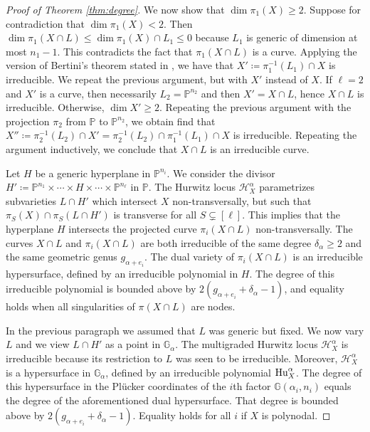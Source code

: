 \documentclass[12pt]{article}
\theoremstyle{definition}
\newcommand{\bG}{\mathbb G}
\newcommand{\bP}{\mathbb P}
\begin{document}
\begin{proof}[Proof of Theorem \ref{thm:degree}]
We now show that $\dim\pi_1(X)\ge 2$. Suppose for contradiction that $\dim\pi_1(X)<2$. Then $\dim\pi_1(X\cap L)\le\dim \pi_1(X)\cap L_1\le 0$ because $L_1$ is generic of dimension at most $n_1-1$. This contradicts the fact that $\pi_1(X\cap L)$ is a curve. Applying the version of Bertini's theorem stated in \cite[Th\'{e}or\`{e}me 6.3(4)]{Jouanolou}, we have that $X'\coloneqq\pi_1^{-1}(L_1)\cap X$ is irreducible. We repeat the previous argument, but with $X'$ instead of $X$.
If $\ell=2$ and $X'$ is a curve, then necessarily $L_2=\bP^{n_2}$ and then $X'=X\cap L$, hence $X\cap L$ is irreducible. Otherwise, $\dim X' \ge 2$. Repeating the previous argument with the projection $\pi_2$ from $\bP$ to $\bP^{n_2}$, we obtain 
find that $X''\coloneqq\pi_2^{-1}(L_2)\cap X'=\pi_2^{-1}(L_2)\cap\pi_1^{-1}(L_1)\cap X$ is irreducible.
Repeating the argument inductively, we conclude that $X \cap L$ is 
an irreducible curve.

Let $H$ be a generic hyperplane in $\bP^{n_i}$.
We consider the divisor $H'\coloneqq\bP^{n_1}\times\cdots\times H\times\cdots\times\bP^{n_\ell}$
in $\bP$.
The Hurwitz locus $\mathcal{H}^\alpha_X$ parametrizes subvarieties $L \cap H'$
which intersect $X$ non-transversally, but such that $\pi_S(X) \cap \pi_S(L \cap H')$ is transverse for all $S \subsetneq [\ell]$. This implies that the hyperplane $H$ intersects the projected curve $\pi_i(X \cap L)$  non-transversally. 
The curves $X \cap L$ and  $\pi_i(X \cap L)$ are both irreducible of 
the same degree $\delta_{\alpha}\ge 2$ and the same geometric genus $g_{\alpha+e_i}$.
The dual variety of  $\pi_i(X \cap L)$ is an irreducible hypersurface, defined by an irreducible
polynomial in $H$. The degree of this irreducible polynomial is bounded above by
$2 (g_{\alpha+e_i} + \delta_\alpha -1)$, and equality holds when
all singularities of $\pi(X \cap L)$ are nodes.

In the previous paragraph we assumed that $L$ was generic but fixed.
We now vary $L$ and we view $L \cap H'$ as a point in $\bG_\alpha$.
The multigraded Hurwitz locus $\mathcal{H}^\alpha_X$ is irreducible because its 
restriction to $L$ was seen to be irreducible. Moreover, $\mathcal{H}^\alpha_X$ is a hypersurface
in $\bG_\alpha$, defined by an irreducible polynomial ${\rm Hu}^\alpha_X$.
The degree of this hypersurface in the Pl\"ucker coordinates
of the $i$th factor $\bG(\alpha_i,n_i)$ equals the
degree of the aforementioned dual hypersurface. That degree is bounded
above by $2 (g_{\alpha+e_i} + \delta_\alpha -1)$.
Equality holds for all $i$ if $X$ is polynodal.
\end{proof}
\end{document}
